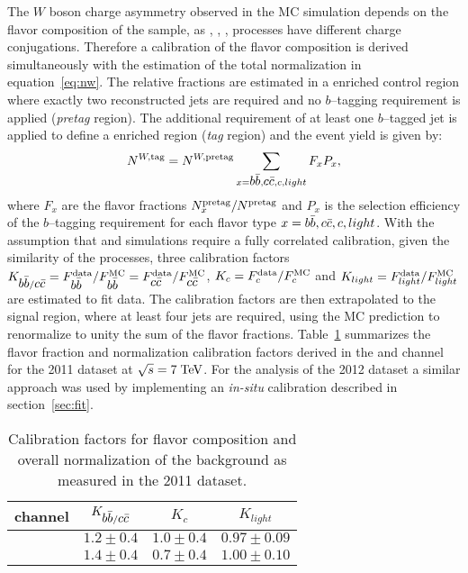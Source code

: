 The $W$ boson charge asymmetry observed in the MC simulation depends
on the flavor composition of the sample, as \wbb{}, \wcc{}, \wc{}, \wlight{}
processes have different charge conjugations.
Therefore a calibration of the flavor composition is derived
simultaneously with the estimation of the total normalization in
equation~\ref{eq:nw}.
The relative fractions are estimated in a \wjets{} enriched control
region where exactly two reconstructed jets are required and no
$b$--tagging requirement is applied ({\it pretag} region). 
The additional requirement of at least one $b$--tagged jet is applied
to define a \wbb{} enriched region ({\it tag} region) and the \wjets{}
event yield is given by: 
\begin{equation}
\label{eq:nwt}
N^{W,{\rm tag}} = 
N^{W,{\rm pretag}}
\sum_{x=\mbox{$b\bar{b}$}{}, \mbox{$c\bar{c}$}{}, c, light} F_xP_x,
\end{equation}
where $F_x$ are the flavor fractions $N^{\rm pretag}_x/N^{\rm pretag}$
and $P_x$ is the selection efficiency of the $b$--tagging requirement for each
flavor type $x = \mbox{$b\bar{b}$}{}, \mbox{$c\bar{c}$}{}, c, light$. 
 With the assumption that \wbb{} and \wcc{} simulations require a
 fully correlated calibration, given the similarity of the processes,
 three calibration factors $K_{\mbox{$b\bar{b}$}{}/\mbox{$c\bar{c}$}{}}=F^{\rm
   data}_{\mbox{$b\bar{b}$}{}}/F^{\rm MC}_{\mbox{$b\bar{b}$}{}}=F^{\rm
   data}_{\mbox{$c\bar{c}$}{}}/F^{\rm MC}_{\mbox{$c\bar{c}$}{}}$, $K_c=F^{\rm data}_{c}/F^{\rm MC}_{c}$ and $K_{light}=F^{\rm
  data}_{light}/F^{\rm MC}_{light}$ are estimated to fit data. The
calibration factors are then extrapolated to the signal region, where
at least four jets are required, using the MC prediction
to renormalize to unity the sum of the flavor fractions.
Table~\ref{tab:wsf} summarizes the flavor fraction and normalization
calibration factors derived in the \ejets{} and \mujets{} channel for
the 2011 dataset at $\sqrt{s} = 7 \; \mathrm{TeV}{}$.
For the analysis of the 2012 dataset a similar approach was used by
implementing an {\it in-situ} calibration described in section~\ref{sec:fit}.

\begin{table}
  \caption{Calibration factors for flavor composition and overall
    normalization of the \wjets{} background as measured in the 2011 dataset.}
  \label{tab:wsf}
  \centering
  \begin{tabular}{lccc}
    \toprule
    channel   & $K_{\mbox{$b\bar{b}$}{}/\mbox{$c\bar{c}$}{}}$   & $K_{c}$       &
    $K_{light}$ \\
    \midrule
    \mujets{}  & $1.2\pm0.4$            & $1.0\pm0.4$ &
    $0.97\pm0.09$\\ 
    \ejets{}    & $1.4\pm0.4$            & $0.7\pm0.4$ &
    $1.00\pm0.10$\\ 
    \bottomrule
  \end{tabular}
\end{table}

